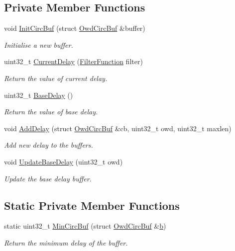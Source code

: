 \subsection*{Private Member Functions}
\begin{DoxyCompactItemize}
\item 
void \hyperlink{classns3_1_1TcpLedbat_a24b91b1f4884b2c3ac7aa2e69d8f6bf2}{Init\+Circ\+Buf} (struct \hyperlink{structns3_1_1TcpLedbat_1_1OwdCircBuf}{Owd\+Circ\+Buf} \&buffer)
\begin{DoxyCompactList}\small\item\em Initialise a new buffer. \end{DoxyCompactList}\item 
uint32\+\_\+t \hyperlink{classns3_1_1TcpLedbat_af8d5dbf7a101ed4c1134132724094bde}{Current\+Delay} (\hyperlink{classns3_1_1TcpLedbat_a44a96f49fc459cec6e691e2d04f56a03}{Filter\+Function} filter)
\begin{DoxyCompactList}\small\item\em Return the value of current delay. \end{DoxyCompactList}\item 
uint32\+\_\+t \hyperlink{classns3_1_1TcpLedbat_a376576d38e2467910d33ce0f0ea6d4ec}{Base\+Delay} ()
\begin{DoxyCompactList}\small\item\em Return the value of base delay. \end{DoxyCompactList}\item 
void \hyperlink{classns3_1_1TcpLedbat_a0d55108658f4ca868e1265ae1a5682c1}{Add\+Delay} (struct \hyperlink{structns3_1_1TcpLedbat_1_1OwdCircBuf}{Owd\+Circ\+Buf} \&cb, uint32\+\_\+t owd, uint32\+\_\+t maxlen)
\begin{DoxyCompactList}\small\item\em Add new delay to the buffers. \end{DoxyCompactList}\item 
void \hyperlink{classns3_1_1TcpLedbat_a1a29435e96f584de98c293b4d640c9f0}{Update\+Base\+Delay} (uint32\+\_\+t owd)
\begin{DoxyCompactList}\small\item\em Update the base delay buffer. \end{DoxyCompactList}\end{DoxyCompactItemize}
\subsection*{Static Private Member Functions}
\begin{DoxyCompactItemize}
\item 
static uint32\+\_\+t \hyperlink{classns3_1_1TcpLedbat_a5ee6ecafab7d35aa17569d75ddb513c8}{Min\+Circ\+Buf} (struct \hyperlink{structns3_1_1TcpLedbat_1_1OwdCircBuf}{Owd\+Circ\+Buf} \&\hyperlink{lte__pathloss_8m_a21ad0bd836b90d08f4cf640b4c298e7c}{b})
\begin{DoxyCompactList}\small\item\em Return the minimum delay of the buffer. \end{DoxyCompactList}\end{DoxyCompactItemize}
